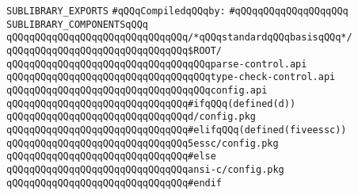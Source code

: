\label{src/lib/c-kit/src/variants/ckit-config.sublib}
\verb|SUBLIBRARY_EXPORTS|\newline
\newline
\verb|#qQQqCompiledqQQqby:|\newline
\verb|#qQQqqQQqqQQqqQQqqQQq|\newline
\newline
\newline
\newline
\verb|SUBLIBRARY_COMPONENTSqQQq|\newline
\newline
\verb|qQQqqQQqqQQqqQQqqQQqqQQqqQQqqQQq/*qQQqstandardqQQqbasisqQQq*/|\newline
\verb|qQQqqQQqqQQqqQQqqQQqqQQqqQQqqQQq$ROOT/|\newline
\newline
\verb|qQQqqQQqqQQqqQQqqQQqqQQqqQQqqQQqqQQqparse-control.api|\newline
\verb|qQQqqQQqqQQqqQQqqQQqqQQqqQQqqQQqqQQqtype-check-control.api|\newline
\verb|qQQqqQQqqQQqqQQqqQQqqQQqqQQqqQQqqQQqconfig.api|\newline
\newline
\verb|qQQqqQQqqQQqqQQqqQQqqQQqqQQqqQQq#ifqQQq(defined(d))|\newline
\verb|qQQqqQQqqQQqqQQqqQQqqQQqqQQqqQQqd/config.pkg|\newline
\verb|qQQqqQQqqQQqqQQqqQQqqQQqqQQqqQQq#elifqQQq(defined(fiveessc))|\newline
\verb|qQQqqQQqqQQqqQQqqQQqqQQqqQQqqQQq5essc/config.pkg|\newline
\verb|qQQqqQQqqQQqqQQqqQQqqQQqqQQqqQQq#else|\newline
\verb|qQQqqQQqqQQqqQQqqQQqqQQqqQQqqQQqansi-c/config.pkg|\newline
\verb|qQQqqQQqqQQqqQQqqQQqqQQqqQQqqQQq#endif|\newline

